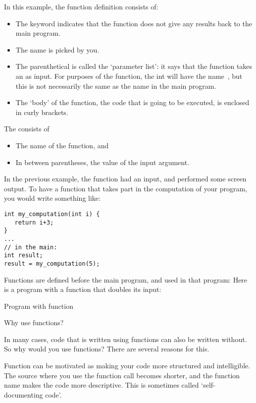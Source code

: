 In this example, the function definition consists of:
\begin{itemize}
\item The keyword  indicates that the function does
  not give any results back to the main program.
\item The name  is picked by you.
\item The parenthetical  is called the `parameter list': it
  says that the function takes an  as input. For purposes of
  the function, the int will have the name~, but this is not
  necessarily the same as the name in the main program.
\item The `body' of the function, the code that is going to be
  executed, is enclosed in curly brackets.
\end{itemize}

The  consists of
\begin{itemize}
\item The name of the function, and
\item In between parentheses, the value of the input argument.
\end{itemize}

In the previous example, the function had an input, and performed some
screen output. To have a function that takes part in the computation
of your program, you would write something like:
\begin{verbatim}
int my_computation(int i) {
   return i+3;
}
...
// in the main:
int result;
result = my_computation(5);
\end{verbatim}

Functions are defined before the main program, and used in that program:
Here is a program with a function that doubles its input:

\begin{block}{Program with function}
  \label{sl:fun-example}
\end{block}

 {Why use functions?}

In many cases, code that is written using functions can also be
written without. So why would you use functions? There are several
reasons for this.

Function can be motivated as making your code more structured and intelligible.
The source where you use the function call becomes shorter,
and the function
name makes the code more descriptive. This is sometimes called
`self-documenting code'.

